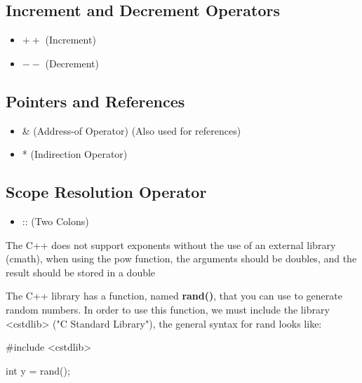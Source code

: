\documentclass{report}
\begin{document}
    \begin{minipage}[t]{0.47\textwidth}
        \subsection{Increment and Decrement Operators}
        \begin{itemize}
          \item \( ++ \) (Increment)
          \item \( -- \) (Decrement)
        \end{itemize}
        \subsection{Pointers and References}
        \begin{itemize}
            \item \& (Address-of Operator) (Also used for references)
            \item * (Indirection Operator)
        \end{itemize}
    \end{minipage}
    \bigbreak \noindent 
    \begin{minipage}[]{0.47\textwidth}
        \subsection{Scope Resolution Operator}
        \begin{itemize}
            \item :: (Two Colons)
        \end{itemize}
    
    \end{minipage}


    \bigbreak \noindent 
    \begin{notebox}
			The C++ does not support exponents without the use of an external library (cmath), when using the pow function, the arguments should be doubles, and the result should be stored in a double
		\end{notebox}

    \pagebreak
    \bigbreak \noindent 
    The C++ library has a function, named \textbf{rand()}, that you can use to generate random numbers. In order to use this function, we must include the library <cstdlib> ("C Standard Library"), the general syntax for rand looks like:
    \smallbreak \noindent
    
    \begin{cppcode}
        #include <cstdlib>
        
        int y = rand();
    \end{cppcode}
    
\end{document}
